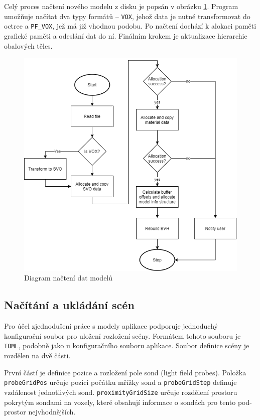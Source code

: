 Celý proces načtení nového modelu z disku je popsán v obrázku \ref{fig:load_model_diagram}. Program umožňuje načítat dva typy formátů -- \texttt{VOX}, jehož data je nutné transformovat do octree a \texttt{PF\_VOX}, jež má již vhodnou podobu. Po načtení dochází k alokaci paměti grafické paměti a odeslání dat do ní. Finálním krokem je aktualizace hierarchie obalových těles.

\begin{figure}[H]
	\centering
	\includegraphics[scale=0.7]{images/load_diagram.png}
	\caption{Diagram načtení dat modelů}
	\label{fig:load_model_diagram}
\end{figure}

\subsection{Načítání a ukládání scén}
Pro účel zjednodušení práce s modely aplikace podporuje jednoduchý konfigurační soubor pro uložení rozložení scény. Formátem tohoto souboru je \texttt{TOML}, podobně jako u konfiguračního souboru aplikace. Soubor definice scény je rozdělen na dvě části.

První částí je definice pozice a rozložení pole sond (light field probes). Položka \texttt{probeGridPos} určuje pozici počátku mřížky sond a \texttt{probeGridStep} definuje vzdálenost jednotlivých sond. \texttt{proximityGridSize} určuje rozdělení prostoru pokrytým sondami na voxely, které obsahují informace o sondách pro tento pod-prostor nejvhodnějších.

